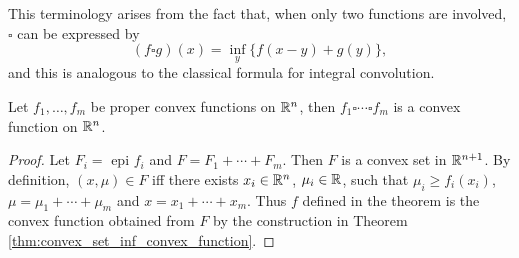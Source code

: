 \documentclass[11pt,a4paper]{article}
\begin{document}
\begin{remark}
    This terminology arises from the fact that, when only two functions are involved, $\square$ can be expressed by
    \begin{equation*}
        (f\square g)(x) = \inf_{y} \{f(x-y)+g(y)\},
    \end{equation*}
    and this is analogous to the classical formula for integral convolution.
\end{remark}

\begin{proposition}
    Let $f_1,\ldots,f_m$ be proper convex functions on $\mathbb{R}^n$, then $f_1\square \cdots \square f_m$ is a convex function on $\mathbb{R}^n$.
\end{proposition}

\begin{proof}
    Let $F_i =$ epi $f_i$ and $F = F_1+\cdots + F_m$. Then $F$ is a convex set in $\mathbb{R}^{n+1}$. By definition, $(x,\mu)\in F$ iff there exists $x_i\in \mathbb{R}^n$, $\mu_i\in \mathbb{R}$, such that $\mu_i\ge f_i(x_i)$, $\mu = \mu_1+\cdots+\mu_m$ and $x = x_1+\cdots + x_m$. Thus $f$ defined in the theorem is the convex function obtained from $F$ by the construction in Theorem \ref{thm:convex_set_inf_convex_function}.
\end{proof}
\end{document}
